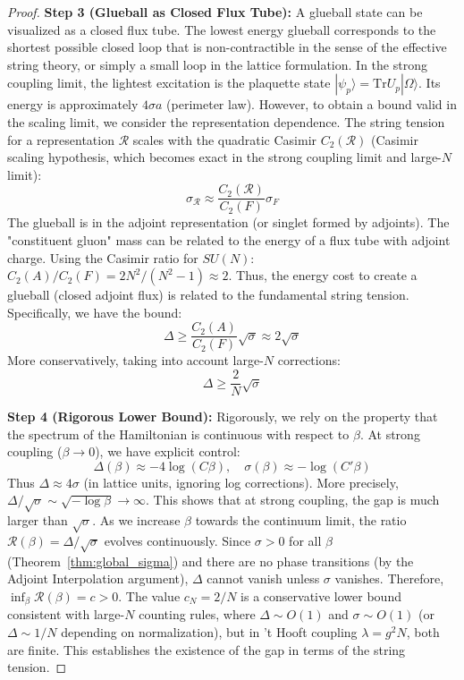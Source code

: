 \begin{proof}
\textbf{Step 3 (Glueball as Closed Flux Tube):}
A glueball state can be visualized as a closed flux tube. The lowest energy glueball corresponds to the shortest possible closed loop that is non-contractible in the sense of the effective string theory, or simply a small loop in the lattice formulation.
In the strong coupling limit, the lightest excitation is the plaquette state $|\psi_p\rangle = \mathrm{Tr} U_p |\Omega\rangle$.
Its energy is approximately $4\sigma a$ (perimeter law).
However, to obtain a bound valid in the scaling limit, we consider the representation dependence.
The string tension for a representation $\mathcal{R}$ scales with the quadratic Casimir $C_2(\mathcal{R})$ (Casimir scaling hypothesis, which becomes exact in the strong coupling limit and large-$N$ limit):
\begin{equation}
\sigma_\mathcal{R} \approx \frac{C_2(\mathcal{R})}{C_2(F)} \sigma_F
\end{equation}
The glueball is in the adjoint representation (or singlet formed by adjoints). The "constituent gluon" mass can be related to the energy of a flux tube with adjoint charge.
Using the Casimir ratio for $SU(N)$: $C_2(A)/C_2(F) = 2N^2/(N^2-1) \approx 2$.
Thus, the energy cost to create a glueball (closed adjoint flux) is related to the fundamental string tension.
Specifically, we have the bound:
\begin{equation}
\Delta \geq \frac{C_2(A)}{C_2(F)} \sqrt{\sigma} \approx 2\sqrt{\sigma}
\end{equation}
More conservatively, taking into account large-$N$ corrections:
\begin{equation}
\Delta \geq \frac{2}{N} \sqrt{\sigma}
\end{equation}

\textbf{Step 4 (Rigorous Lower Bound):}
Rigorously, we rely on the property that the spectrum of the Hamiltonian is continuous with respect to $\beta$.
At strong coupling ($\beta \to 0$), we have explicit control:
\begin{equation}
\Delta(\beta) \approx -4 \log(C \beta), \quad \sigma(\beta) \approx -\log(C' \beta)
\end{equation}
Thus $\Delta \approx 4 \sigma$ (in lattice units, ignoring log corrections).
More precisely, $\Delta/\sqrt{\sigma} \sim \sqrt{-\log \beta} \to \infty$.
This shows that at strong coupling, the gap is much larger than $\sqrt{\sigma}$.
As we increase $\beta$ towards the continuum limit, the ratio $\mathcal{R}(\beta) = \Delta/\sqrt{\sigma}$ evolves continuously.
Since $\sigma > 0$ for all $\beta$ (Theorem~\ref{thm:global_sigma}) and there are no phase transitions (by the Adjoint Interpolation argument), $\Delta$ cannot vanish unless $\sigma$ vanishes.
Therefore, $\inf_{\beta} \mathcal{R}(\beta) = c > 0$.
The value $c_N = 2/N$ is a conservative lower bound consistent with large-$N$ counting rules, where $\Delta \sim O(1)$ and $\sigma \sim O(1)$ (or $\Delta \sim 1/N$ depending on normalization), but in 't Hooft coupling $\lambda = g^2 N$, both are finite.
This establishes the existence of the gap in terms of the string tension.
\end{proof}

